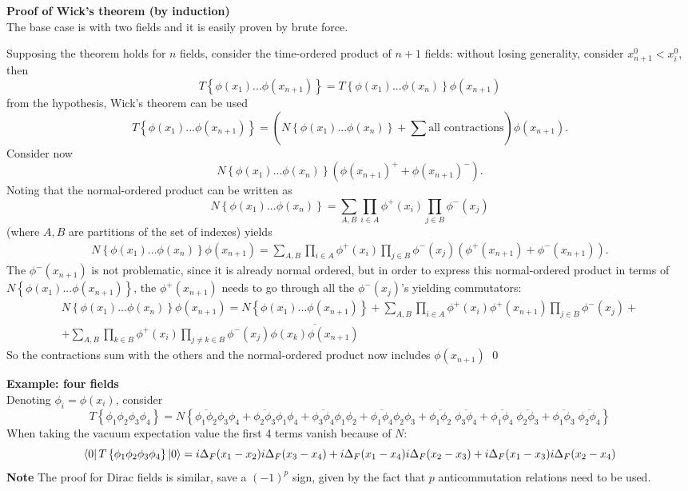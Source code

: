 
\textbf{Proof of Wick's theorem (by induction)}\\
The base case is with two fields and it is easily proven by brute force.

Supposing the theorem holds for $n$ fields, consider the time-ordered product
of $n+1$ fields: without losing generality, consider $x^0_{n+1}<x_i^0$, then
$$T\left\{\phi(x_1)...\phi(x_{n+1})\right\}=T\left\{\phi(x_1)...\phi(x_n)
\right\}\phi(x_{n+1})$$
from the hypothesis, Wick's theorem can be used
$$T\left\{\phi(x_1)...\phi(x_{n+1})\right\} =\left( N\left\{\phi(x_1)...\phi(x_n)
\right\} + \sum_{}^{}\text{all contractions}\right)\phi(x_{n+1}).$$
Consider now
$$N\left\{\phi(x_1)...\phi(x_n)\right\}\left(\phi(x_{n+1})^++\phi(x_{n+1})^-
\right).$$
Noting that the normal-ordered product can be written as
$$N\left\{\phi(x_1)...\phi(x_n)\right\} = \sum_{A,B}\prod_{i\in A}\phi^+(x_i)
\prod_{j\in B}\phi^-(x_j)$$
(where $A,B$ are partitions of the set of indexes) yields
\begin{gather*}
N\left\{\phi(x_1)...\phi(x_n)\right\}\phi(x_{n+1}) = 
\sum_{A,B}\prod_{i\in A}\phi^+(x_i)\prod_{j\in B}\phi^-(x_j)\left(\phi^+(x_{n+1})
+\phi^-(x_{n+1})\right).
\end{gather*}
The $\phi^-(x_{n+1})$ is not problematic, since it is already normal ordered, but
in order to express this normal-ordered product in terms of $N\left\{\phi(x_1)...
\phi(x_{n+1})\right\}$, the $\phi^+(x_{n+1})$ needs to go through all the
$\phi^-(x_j)$'s yielding commutators:
\begin{gather*}
N\left\{\phi(x_1)...\phi(x_n)\right\}\phi(x_{n+1}) = 
N\left\{\phi(x_1)...\phi(x_{n+1})\right\} + \sum_{A,B}^{}\prod_{i\in A}\phi^+(x_i)
\phi^+(x_{n+1})\prod_{j\in B}\phi^-(x_j) +\\+\sum_{A,B}\prod_{k\in B}\phi^+(x_i)
\prod_{j\neq k \in B} \phi^-(x_j)\overline{\phi(x_k)\phi(x_{n+1})}
\end{gather*}
So the contractions sum with the others and the normal-ordered product now
includes $\phi(x_{n+1})$ \qed

\textbf{Example: four fields}\\
Denoting $\phi_i = \phi(x_i)$, consider
$$T\left\{\phi_1\phi_2\phi_3\phi_4\right\} = N\left\{
    \overline{\phi_1\phi_2}\phi_3\phi_4 + \overline{\phi_2\phi_3}\phi_1\phi_4 +
    \overline{\phi_3\phi_4}\phi_1\phi_2 + \overline{\phi_1\phi_4}\phi_2\phi_3+
    \overline{\phi_1\phi_2}\;\overline{\phi_3\phi_4}+
    \overline{\phi_1\phi_4}\;\overline{\phi_2\phi_3}+
    \overline{\phi_1\phi_3}\;\overline{\phi_2\phi_4}
\right\}$$
When taking the vacuum expectation value the first 4 terms vanish because of $N$:
$$\bra{0}T\left\{\phi_1\phi_2\phi_3\phi_4\right\}\ket{0}=
i\Delta_F(x_1-x_2)i\Delta_F(x_3-x_4)+
i\Delta_F(x_1-x_4)i\Delta_F(x_2-x_3)+
i\Delta_F(x_1-x_3)i\Delta_F(x_2-x_4)
$$
\textbf{Note} The proof for Dirac fields is similar, save a $(-1)^p$ sign, given
by the fact that $p$ anticommutation relations need to be used.
